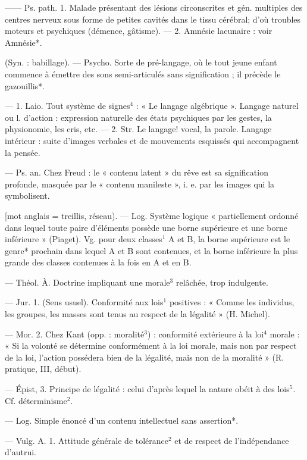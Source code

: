 	\begin{itemize}[leftmargin=1cm, label=, itemsep=1pt]
 —— Ps. path. 1. Malade
présentant des lésions circonscrites
et gén. multiples des centres nerveux sous forme de petites cavités
dans le tissu cérébral; d’où troubles
moteurs et psychiques (démence,
gâtisme). — 2. Amnésie lacunaire :
voir Amnésie*.

 (Syn. : babillage). — Psycho.
Sorte de pré-langage, où le tout
jeune enfant commence à émettre
des sons semi-articulés sans signification ; il précède le gazouillis*.

 — 1. Laio. Tout système de
signes$^4$ : « Le langage algébrique ».
Langage naturel ou l. d'action :
expression naturelle des états psychiques par les gestes, la physionomie, les cris, etc. — 2. Str. Le
langage! vocal, la parole. Langage
intérieur : suite d'images verbales
et de mouvements esquissés qui
accompagnent la pensée.

 — Ps. an. Chez Freud : le
« contenu latent » du rêve est sa
signification profonde, masquée par
le « contenu manileste », i. e. par les
images qui la symbolisent.

 [mot anglais = treillis, réseau).
— Log. Système logique « partiellement ordonné dans lequel toute
paire d'éléments possède une borne
supérieure et une borne inférieure »
(Piaget). Vg. pour deux classes$^1$ A
et B, la borne supérieure est le
genre* prochain dans lequel A et B
sont contenues, et la borne inférieure la plus grande des classes
contenues à la fois en A et en B.

 — Théol. À. Doctrine impliquant une morale$^3$ relâchée, trop
indulgente.

 — Jur. 1. (Sens usuel). Conformité aux lois$^1$ positives : « Comme
les individus, les groupes, les masses
sont tenus au respect de la légalité » (H. Michel).

— Mor. 2. Chez Kant (opp. : moralité$^3$) : conformité extérieure à la
loi$^4$ morale : « Si la volonté se détermine conformément à la loi morale,
mais non par respect de la loi,
l’action possédera bien de la légalité, mais non de la moralité »
(R. pratique, III, début).

— Épist, 3. Principe de légalité :
celui d’après lequel la nature obéit
à des lois$^5$. Cf. déterminisme$^2$.

 — Log. Simple énoncé d’un
contenu intellectuel sans assertion*.

 — Vulg. A. 1. Attitude
générale de tolérance$^2$ et de respect
de l'indépendance d’autrui.


\end{itemize}
